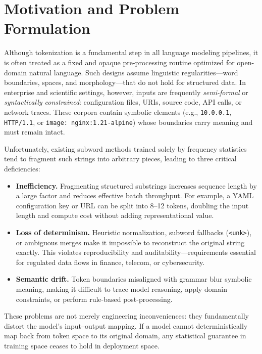 \section{Motivation and Problem Formulation}
\label{sec:motivation}

Although tokenization is a fundamental step in all language modeling pipelines, it is often treated as a fixed and opaque pre-processing routine optimized for open-domain natural language.
Such designs assume linguistic regularities—word boundaries, spaces, and morphology—that do not hold for structured data.
In enterprise and scientific settings, however, inputs are frequently \emph{semi-formal} or \emph{syntactically constrained}: configuration files, URIs, source code, API calls, or network traces.
These corpora contain symbolic elements (e.g., \texttt{10.0.0.1}, \texttt{HTTP/1.1}, or \texttt{image: nginx:1.21-alpine}) whose boundaries carry meaning and must remain intact.

Unfortunately, existing subword methods trained solely by frequency statistics tend to fragment such strings into arbitrary pieces, leading to three critical deficiencies:

\begin{itemize}
  \item \textbf{Inefficiency.}
  Fragmenting structured substrings increases sequence length by a large factor and reduces effective batch throughput.
  For example, a YAML configuration key or URL can be split into 8–12 tokens, doubling the input length and compute cost without adding representational value.
  \item \textbf{Loss of determinism.}
  Heuristic normalization, subword fallbacks (\texttt{<unk>}), or ambiguous merges make it impossible to reconstruct the original string exactly.
  This violates reproducibility and auditability—requirements essential for regulated data flows in finance, telecom, or cybersecurity.
  \item \textbf{Semantic drift.}
  Token boundaries misaligned with grammar blur symbolic meaning, making it difficult to trace model reasoning, apply domain constraints, or perform rule-based post-processing.
\end{itemize}

These problems are not merely engineering inconveniences: they fundamentally distort the model’s input–output mapping.
If a model cannot deterministically map back from token space to its original domain, any statistical guarantee in training space ceases to hold in deployment space.

